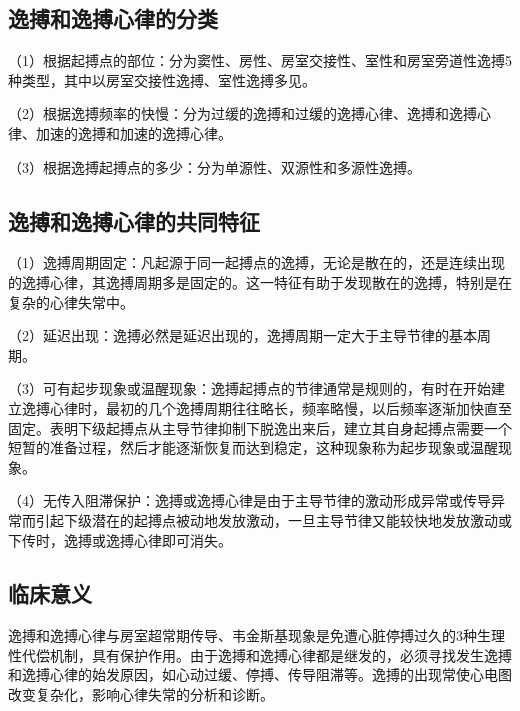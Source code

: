 \protect\hypertarget{text00019.htmlux5cux23subid170}{}{}

\subsection{逸搏和逸搏心律的分类}

（1）根据起搏点的部位：分为窦性、房性、房室交接性、室性和房室旁道性逸搏5种类型，其中以房室交接性逸搏、室性逸搏多见。

（2）根据逸搏频率的快慢：分为过缓的逸搏和过缓的逸搏心律、逸搏和逸搏心律、加速的逸搏和加速的逸搏心律。

（3）根据逸搏起搏点的多少：分为单源性、双源性和多源性逸搏。

\protect\hypertarget{text00019.htmlux5cux23subid171}{}{}

\subsection{逸搏和逸搏心律的共同特征}

（1）逸搏周期固定：凡起源于同一起搏点的逸搏，无论是散在的，还是连续出现的逸搏心律，其逸搏周期多是固定的。这一特征有助于发现散在的逸搏，特别是在复杂的心律失常中。

（2）延迟出现：逸搏必然是延迟出现的，逸搏周期一定大于主导节律的基本周期。

（3）可有起步现象或温醒现象：逸搏起搏点的节律通常是规则的，有时在开始建立逸搏心律时，最初的几个逸搏周期往往略长，频率略慢，以后频率逐渐加快直至固定。表明下级起搏点从主导节律抑制下脱逸出来后，建立其自身起搏点需要一个短暂的准备过程，然后才能逐渐恢复而达到稳定，这种现象称为起步现象或温醒现象。

（4）无传入阻滞保护：逸搏或逸搏心律是由于主导节律的激动形成异常或传导异常而引起下级潜在的起搏点被动地发放激动，一旦主导节律又能较快地发放激动或下传时，逸搏或逸搏心律即可消失。

\protect\hypertarget{text00019.htmlux5cux23subid172}{}{}

\subsection{临床意义}

逸搏和逸搏心律与房室超常期传导、韦金斯基现象是免遭心脏停搏过久的3种生理性代偿机制，具有保护作用。由于逸搏和逸搏心律都是继发的，必须寻找发生逸搏和逸搏心律的始发原因，如心动过缓、停搏、传导阻滞等。逸搏的出现常使心电图改变复杂化，影响心律失常的分析和诊断。

\protect\hypertarget{text00019.htmlux5cux23subid173}{}{}

